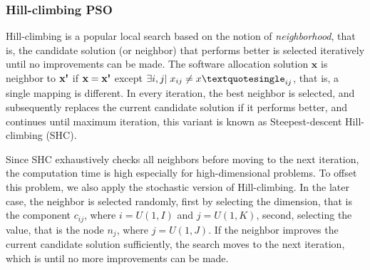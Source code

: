\subsubsection{Hill-climbing PSO}
Hill-climbing is a popular local search based on the notion of \textit{neighborhood}, that is, the candidate solution (or neighbor) that performs better is selected iteratively until no improvements can be made. The software allocation solution $\textbf{x}$ is neighbor to $\textbf{x\textquotesingle}$ if $\textbf{x}=\textbf{x\textquotesingle}$ except $\exists i,j|\;x_{ij}\neq x\textquotesingle_{ij}$, that is, a single mapping is different. In every iteration, the best neighbor is selected, and subsequently replaces the current candidate solution if it performs better, and continues until maximum iteration, this variant is known as Steepest-descent Hill-climbing (SHC).

Since SHC exhaustively checks all neighbors before moving to the next iteration, the computation time is high especially for high-dimensional problems. To offset this problem, we also apply the stochastic version of Hill-climbing. In the later case, the neighbor is selected randomly, first by selecting the dimension, that is the component $c_{ij}$, where $i=U(1,I)$ and $j=U(1,K)$, second, selecting the value, that is the node $n_j$, where $j=U(1,J)$. If the neighbor improves the current candidate solution sufficiently, the search moves to the next iteration, which is until no more improvements can be made.

